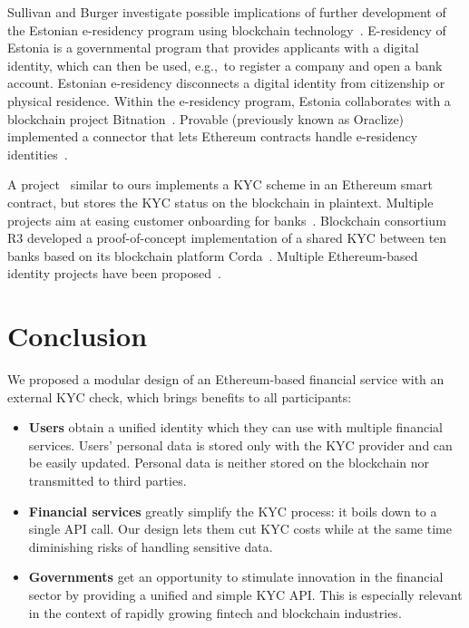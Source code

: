 Sullivan and Burger investigate possible implications of further development of the Estonian e-residency program using blockchain technology~\cite{Sullivan2017}.
E-residency of Estonia is a governmental program that provides applicants with a digital identity, which can then be used, e.g.,~to register a company and open a bank account.
Estonian e-residency disconnects a digital identity from citizenship or physical residence.
Within the e-residency program, Estonia collaborates with a blockchain project Bitnation~\cite{Bitnation15, Estonia15}.
Provable (previously known as Oraclize) implemented a connector that lets Ethereum contracts handle e-residency identities~\cite{Provable}.

A project~\cite{Ohtamaa2016} similar to ours implements a KYC scheme in an Ethereum smart contract, but stores the KYC status on the blockchain in plaintext.
Multiple projects aim at easing customer onboarding for banks~\cite{CambridgeBlockchain, KycChain, SnapSwap, Tradle}.
Blockchain consortium R3 developed a proof-of-concept implementation of a shared KYC between ten banks based on its blockchain platform Corda~\cite{Allison2016}.
Multiple Ethereum-based identity projects have been proposed~\cite{Mesropyan2017, Sovrin, Uport}.



\section{Conclusion}

We proposed a modular design of an Ethereum-based financial service with an external KYC check, which brings benefits to all participants:

\begin{itemize}
	\item \textbf{Users} obtain a unified identity which they can use with multiple financial services.
	Users' personal data is stored only with the KYC provider and can be easily updated.
	Personal data is neither stored on the blockchain nor transmitted to third parties.
	\item \textbf{Financial services} greatly simplify the KYC process: it boils down to a single API call.
	Our design lets them cut KYC costs while at the same time diminishing risks of handling sensitive data.
	\item \textbf{Governments} get an opportunity to stimulate innovation in the financial sector by providing a unified and simple KYC API\@.
	This is especially relevant in the context of rapidly growing fintech and blockchain industries.
\end{itemize}

